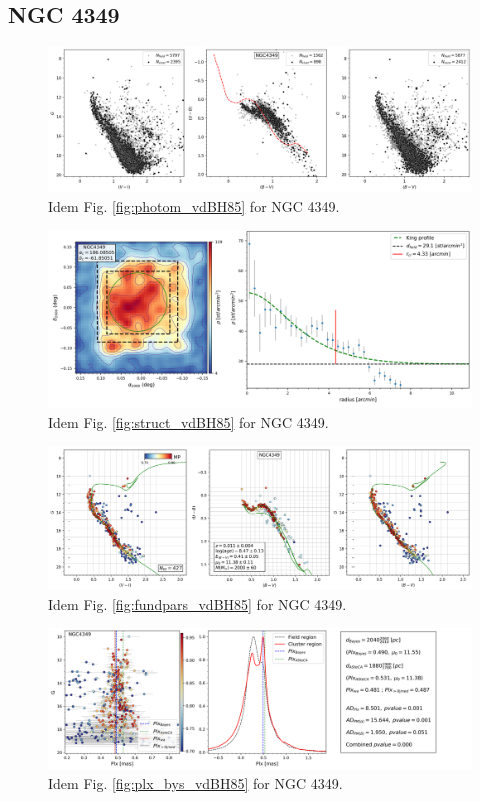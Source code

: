 \documentclass[referee]{aa}
\begin{document}
\subsection{NGC 4349}

\begin{figure}[ht]
    \centering
    \includegraphics[width=\hsize]{../figs/obs_NGC4349.png}
    \caption{Idem Fig. \ref{fig:photom_vdBH85} for NGC 4349.}
    \label{fig63}
\end{figure}
\begin{figure}[ht]
    \centering
    \includegraphics[width=\hsize]{../figs/dmap_ngc4349.png}
    \caption{Idem Fig. \ref{fig:struct_vdBH85} for NGC 4349.}
    \label{fig64}
\end{figure}
\begin{figure}[ht]
    \centering
    \includegraphics[width=\hsize]{../figs/cmds_ngc4349.png}
    \caption{Idem Fig. \ref{fig:fundpars_vdBH85} for NGC 4349.}
    \label{fig65}
\end{figure}
\begin{figure}[ht]
    \centering
    \includegraphics[width=\hsize]{../figs/plx_NGC4349.png}
    \caption{Idem Fig. \ref{fig:plx_bys_vdBH85} for NGC 4349.}
    \label{fig:plx_bys_NGC4349}
\end{figure}
\end{document}
